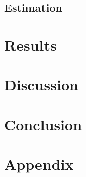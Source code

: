 \subsection{Estimation}
\section*{Results}

\section*{Discussion}

\section*{Conclusion}

\section*{Appendix}